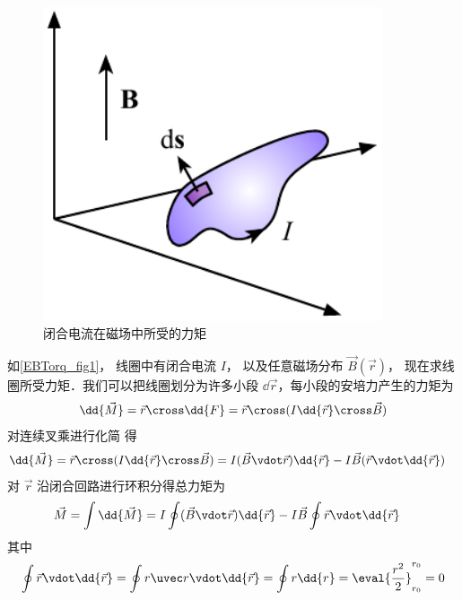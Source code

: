 
\begin{figure}[ht]
\centering
\includegraphics[width=10cm]{./figures/EBTorq1.pdf}
\caption{闭合电流在磁场中所受的力矩} \label{EBTorq_fig1}
\end{figure}
如\autoref{EBTorq_fig1}， 线圈中有闭合电流 $I$， 以及任意磁场分布 $\vec B(\vec r)$， 现在求线圈所受力矩．我们可以把线圈划分为许多小段 $\dd{\vec r}$，每小段的安培力产生的力矩为
\begin{equation}
\dd{\vec M} = \vec r\cross \dd{F} = \vec r \cross (I \dd{\vec r} \cross \vec B)
\end{equation}
对连续叉乘进行化简 得
\begin{equation}
\begin{aligned}
\dd{\vec M} &=  \vec r \cross (I\dd{\vec r} \cross \vec B) =  I (\vec B \vdot \vec r) \dd{\vec r}  -  I\vec B (\vec r \vdot \dd{\vec r})
\end{aligned}
\end{equation}
对 $\vec r$ 沿闭合回路进行环积分得总力矩为
\begin{equation}
\begin{aligned}
\vec M & = \int \dd{\vec M} = I\oint (\vec B\vdot\vec r)\dd{\vec r}  - I\vec B\oint \vec r \vdot \dd{\vec r}
\end{aligned}
\end{equation}
其中
\begin{equation}
\oint \vec r \vdot \dd{\vec r}  = \oint r \uvec r \vdot \dd{\vec r}  = \oint r \dd{r}  = \eval{\frac{r^2}{2}}_{r_0}^{r_0}  = 0 %
\end{equation}
